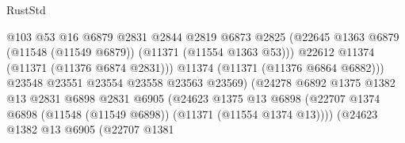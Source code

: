 \begin{lexlean}{RustStd}
\begin{coremodule}
                                              @103
                                              @53
                                              @16
                                              @6879
                                              @2831
                                              @2844
                                              @2819
                                              @6873
                                              @2825
                                              (@22645
                                                @1363
                                                @6879
                                                (@11548 (@11549 @6879))
                                                (@11371 (@11554 @1363 @53)))
                                              @22612
                                              @11374
                                              (@11371 (@11376 @6874 @2831)))
                                            @11374
                                            (@11371 (@11376 @6864 @6882)))
                                          @23548
                                          @23551
                                          @23554
                                          @23558
                                          @23563
                                          @23569)
                                        (@24278
                                          @6892
                                          @1375
                                          @1382
                                          @13
                                          @2831
                                          @6898
                                          @2831
                                          @6905
                                          (@24623
                                            @1375
                                            @13
                                            @6898
                                            (@22707
                                              @1374
                                              @6898
                                              (@11548 (@11549 @6898))
                                              (@11371 (@11554 @1374 @13))))
                                          (@24623
                                            @1382
                                            @13
                                            @6905
                                            (@22707
                                              @1381

\end{coremodule}
\end{lexlean}
